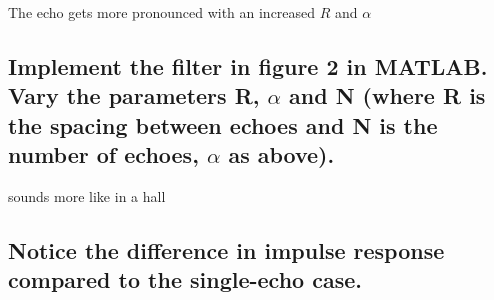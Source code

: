 The echo gets more pronounced with an increased $R$ and $\alpha$


\subsection*{Implement the filter in figure 2 in MATLAB. Vary the parameters R, $\alpha$ and N (where R is the spacing between echoes and N is the number of echoes, $\alpha$ as above).}
sounds more like in a hall

\subsection*{Notice the difference in impulse response compared to the single-echo case.}
